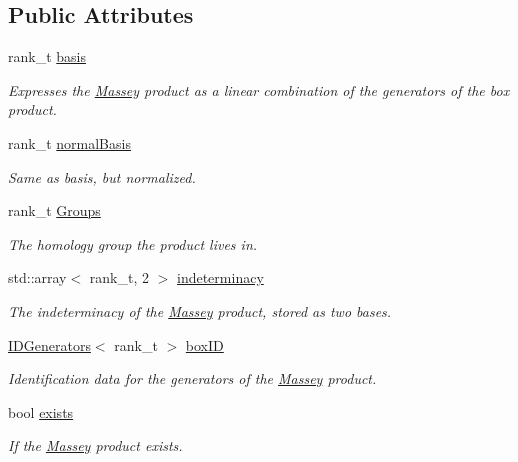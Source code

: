 \subsection*{Public Attributes}
\begin{DoxyCompactItemize}
\item 
rank\+\_\+t \hyperlink{classMackey_1_1Massey_ab738306412d735a31df4913c20948d65}{basis}
\begin{DoxyCompactList}\small\item\em Expresses the \hyperlink{classMackey_1_1Massey}{Massey} product as a linear combination of the generators of the box product. \end{DoxyCompactList}\item 
rank\+\_\+t \hyperlink{classMackey_1_1Massey_a36e3aa9de7d7617feb243d886c5936c8}{normal\+Basis}
\begin{DoxyCompactList}\small\item\em Same as basis, but normalized. \end{DoxyCompactList}\item 
rank\+\_\+t \hyperlink{classMackey_1_1Massey_a221c49aa23c7d7cb9a3d26db9e6e4a94}{Groups}
\begin{DoxyCompactList}\small\item\em The homology group the product lives in. \end{DoxyCompactList}\item 
std\+::array$<$ rank\+\_\+t, 2 $>$ \hyperlink{classMackey_1_1Massey_a16f62ab5c5d3960702ae9804a3cbdb1f}{indeterminacy}
\begin{DoxyCompactList}\small\item\em The indeterminacy of the \hyperlink{classMackey_1_1Massey}{Massey} product, stored as two bases. \end{DoxyCompactList}\item 
\hyperlink{classMackey_1_1IDGenerators}{I\+D\+Generators}$<$ rank\+\_\+t $>$ \hyperlink{classMackey_1_1Massey_ae105b04a17ced9c6fd8fef94a9b56aa2}{box\+ID}
\begin{DoxyCompactList}\small\item\em Identification data for the generators of the \hyperlink{classMackey_1_1Massey}{Massey} product. \end{DoxyCompactList}\item 
bool \hyperlink{classMackey_1_1Massey_a7890eb54ac6d6c48576ba131a59e551f}{exists}
\begin{DoxyCompactList}\small\item\em If the \hyperlink{classMackey_1_1Massey}{Massey} product exists. \end{DoxyCompactList}\item 

\end{DoxyCompactItemize}
